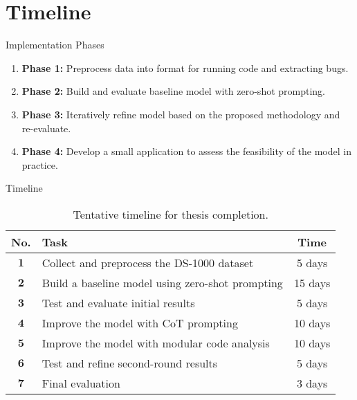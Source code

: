 \section{Timeline}

\begin{frame}{Implementation Phases}
    \begin{enumerate}
        \item \textbf{Phase 1:} Preprocess data into format for running code and extracting bugs.

        \item \textbf{Phase 2:} Build and evaluate baseline model with zero-shot prompting.

        \item \textbf{Phase 3:} Iteratively refine model based on the proposed methodology and re-evaluate.

        \item \textbf{Phase 4:} Develop a small application to assess the feasibility of the model in practice.
    \end{enumerate}
\end{frame}

\begin{frame}{Timeline}
    \begin{table}[!htb]
        \captionsetup{font=small,labelformat=empty}
        \caption{Tentative timeline for thesis completion.}
        \begin{center}
            \begin{tabular}{clc}
                \hline
                No.          & Task                                             & Time    \\
                \hline\hline
                $\mathbf{1}$ & Collect and preprocess the DS-1000 dataset       & 5 days  \\
                \hline
                $\mathbf{2}$ & Build a baseline model using zero-shot prompting & 15 days \\
                \hline
                $\mathbf{3}$ & Test and evaluate initial results                & 5 days  \\
                \hline
                $\mathbf{4}$ & Improve the model with CoT prompting             & 10 days \\
                \hline
                $\mathbf{5}$ & Improve the model with modular code analysis     & 10 days \\
                \hline
                $\mathbf{6}$ & Test and refine second-round results             & 5 days  \\
                \hline
                $\mathbf{7}$ & Final evaluation                                 & 3 days  \\
                \hline
            \end{tabular}
        \end{center}
    \end{table}
\end{frame}
